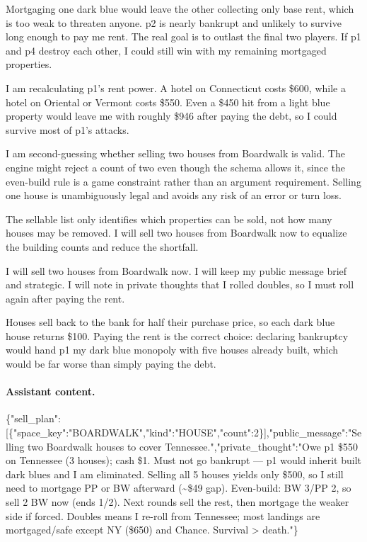 {\par
Mortgaging one dark blue would leave the other collecting only base rent, which is too weak to threaten anyone. p2 is nearly bankrupt and unlikely to survive long enough to pay me rent. The real goal is to outlast the final two players. If p1 and p4 destroy each other, I could still win with my remaining mortgaged properties.
\par
I am recalculating p1's rent power. A hotel on Connecticut costs \$600, while a hotel on Oriental or Vermont costs \$550. Even a \$450 hit from a light blue property would leave me with roughly \$946 after paying the debt, so I could survive most of p1's attacks.
\par
I am second-guessing whether selling two houses from Boardwalk is valid. The engine might reject a count of two even though the schema allows it, since the even-build rule is a game constraint rather than an argument requirement. Selling one house is unambiguously legal and avoids any risk of an error or turn loss.
\par
The sellable list only identifies which properties can be sold, not how many houses may be removed. I will sell two houses from Boardwalk now to equalize the building counts and reduce the shortfall.
\par
I will sell two houses from Boardwalk now. I will keep my public message brief and strategic. I will note in private thoughts that I rolled doubles, so I must roll again after paying the rent.
\par
Houses sell back to the bank for half their purchase price, so each dark blue house returns \$100. Paying the rent is the correct choice: declaring bankruptcy would hand p1 my dark blue monopoly with five houses already built, which would be far worse than simply paying the debt.\par}

\paragraph{Assistant content.}

{\small \{"sell\_plan":[\{"space\_key":"BOARDWALK","kind":"HOUSE","count":2\}],"public\_message":"Selling two Boardwalk houses to cover Tennessee.","private\_thought":"Owe p1 \$550 on Tennessee (3 houses); cash \$1. Must not go bankrupt — p1 would inherit built dark blues and I am eliminated. Selling all 5 houses yields only \$500, so I still need to mortgage PP or BW afterward (\textasciitilde{}\$49 gap). Even-build: BW 3/PP 2, so sell 2 BW now (ends 1/2). Next rounds sell the rest, then mortgage the weaker side if forced. Doubles means I re-roll from Tennessee; most landings are mortgaged/safe except NY (\$650) and Chance. Survival > death."\}\par}

